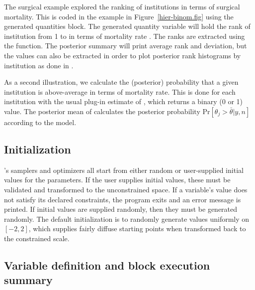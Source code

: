 \documentclass[article]{jss}
\begin{document}
The  surgical example explored the ranking of
institutions in terms of surgical mortality.  This is coded in the
example in Figure~\ref{hier-binom.fig} using the generated quantities
block.  The generated quantity variable  will hold the
rank of institution  from 1 to  in terms of mortality
rate .  The ranks are extracted using the 
function. The posterior summary will print average rank and deviation,
but the values can also be extracted in order to plot posterior rank
histograms by institution as done in \citep[Examples, Volume
1]{LunnEtAl:2000}.

As a second illustration, we calculate the (posterior) probability
that a given institution is above-average in terms of mortality rate.
This is done for each institution  with the usual plug-in
estimate of , which returns a binary (0
or 1) value.  The posterior mean of  calculates
the posterior probability $\mbox{Pr}[\theta_j > \bar{\theta}|y,n]$
according to the model.

\subsection{Initialization}

's samplers and optimizers all start from either random
or user-supplied initial values for the parameters.  If the user
supplies initial values, these must be validated and transformed to
the unconstrained space.  If a variable's value does not satisfy its
declared constraints, the program exits and an error message is
printed.  If initial values are supplied randomly, then they must be
generated randomly.  The default initialization is to randomly
generate values uniformly on $[-2,2]$, which supplies fairly diffuse
starting points when transformed back to the constrained scale.

\subsection{Variable definition and block execution summary}
\end{document}
